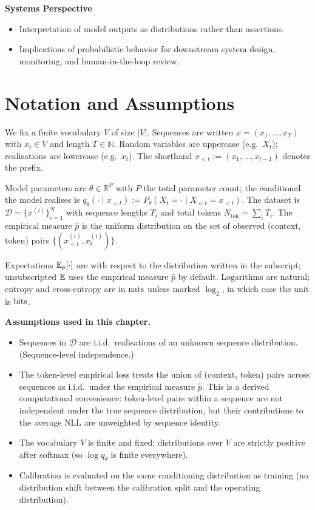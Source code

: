 \textbf{Systems Perspective}
\begin{itemize}
  \item Interpretation of model outputs as distributions rather than assertions.
  \item Implications of probabilistic behavior for downstream system design, monitoring, and human-in-the-loop review.
\end{itemize}

\section{Notation and Assumptions}
\label{sec:ch1_notation}

\begin{notationbox}
We fix a finite vocabulary $V$ of size $|V|$. Sequences are written
$x = (x_1, \dots, x_T)$ with $x_t \in V$ and length $T \in \mathbb{N}$.
Random variables are uppercase (e.g.\ $X_t$); realisations are lowercase
(e.g.\ $x_t$). The shorthand $x_{<t} := (x_1, \dots, x_{t-1})$ denotes
the prefix.

Model parameters are $\theta \in \mathbb{R}^P$ with $P$ the total
parameter count; the conditional the model realises is $q_\theta(\cdot
\mid x_{<t}) := P_\theta(X_t = \cdot \mid X_{<t} = x_{<t})$. The dataset
is $\mathcal{D} = \{x^{(i)}\}_{i=1}^{N}$ with sequence lengths $T_i$ and
total tokens $N_{\mathrm{tok}} = \sum_i T_i$. The empirical measure
$\hat{p}$ is the uniform distribution on the set of observed
(context, token) pairs $\{(x^{(i)}_{<t}, x^{(i)}_t)\}$.

Expectations $\mathbb{E}_p[\cdot]$ are with respect to the distribution written
in the subscript; unsubscripted $\mathbb{E}$ uses the empirical measure
$\hat{p}$ by default. Logarithms are natural; entropy and cross-entropy
are in $\mathrm{nats}$ unless marked $\log_2$, in which case the unit is
$\mathrm{bits}$.

\textbf{Assumptions used in this chapter.}
\begin{itemize}
  \item[A1.1a] Sequences in $\mathcal{D}$ are i.i.d.\ realisations of an
  unknown sequence distribution. (Sequence-level independence.)
  \item[A1.1b] The token-level empirical loss treats the union of
  (context, token) pairs across sequences as i.i.d.\ under the
  empirical measure $\hat{p}$. This is a derived computational
  convenience: token-level pairs within a sequence are not
  independent under the true sequence distribution, but their
  contributions to the average NLL are unweighted by sequence
  identity.
  \item[A1.2] The vocabulary $V$ is finite and fixed; distributions over
  $V$ are strictly positive after softmax (so $\log q_\theta$ is finite
  everywhere).
  \item[A1.3] Calibration is evaluated on the same conditioning
  distribution as training (no distribution shift between the calibration
  split and the operating distribution).
\end{itemize}
\end{notationbox}

